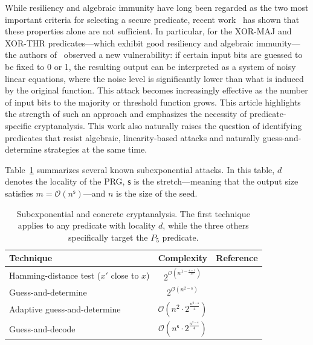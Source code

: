 While resiliency and algebraic immunity have long been regarded as the two most important criteria for selecting a secure predicate, recent work~\cite{EPRINT:FLLL24} has shown that these properties alone are not sufficient. In particular, for the \textsf{XOR-MAJ} and \textsf{XOR-THR} predicates—which exhibit good resiliency and algebraic immunity—the authors of~\cite{EPRINT:FLLL24} observed a new vulnerability: if certain input bits are guessed to be fixed to 0 or 1, the resulting output can be interpreted as a system of noisy linear equations, where the noise level is significantly lower than what is induced by the original function.
This attack becomes increasingly effective as the number of input bits to the majority or threshold function grows. This article highlights the strength of such an approach and emphasizes the necessity of predicate-specific cryptanalysis. This work also naturally raises the question of identifying predicates that resist  algebraic, linearity-based attacks and naturally guess-and-determine strategies at the same time.

Table~\ref{tab:subexpattacks} summarizes several known subexponential attacks. In this table, $d$ denotes the locality of the PRG, $\mathsf{s}$ is the stretch—meaning that the output size satisfies $m = \mathcal{O}(n^{\mathsf{s}})$—and $n$ is the size of the seed.


\begin{table}[!ht]
\centering
\begin{tabular}{@{}lcl@{}}
\toprule
Technique & Complexity & Reference \\
\midrule
Hamming-distance test ($x'$ close to $x$) & $2^{\mathcal{O}(n^{1 - \frac{\mathsf{s} - 1}{2d}})}$ & \cite{EPRINT:Applebaum15,DBLP:conf/approx/BogdanovQ09} \\
Guess-and-determine & $2^{\mathcal{O}(n^{2 - \mathsf{s}})}$ & \cite{AC:CDMRR18} \\
Adaptive guess-and-determine & $\mathcal{O}(n^2 \cdot 2^{\frac{n^{2 - \mathsf{s}}}{4}})$ & \cite{DBLP:journals/tit/YangGJL22} \\
Guess-and-decode & $\mathcal{O}(n^{\mathsf{s}} \cdot 2^{\frac{n^{2 - \mathsf{s}}}{4}})$ & \cite{DBLP:journals/tit/YangGJL22} \\
\bottomrule
\end{tabular}
\caption{\label{tab:subexpattacks}Subexponential and concrete cryptanalysis. The first technique applies to any predicate with locality $d$, while the three others specifically target the $P_5$ predicate.}
\end{table}



